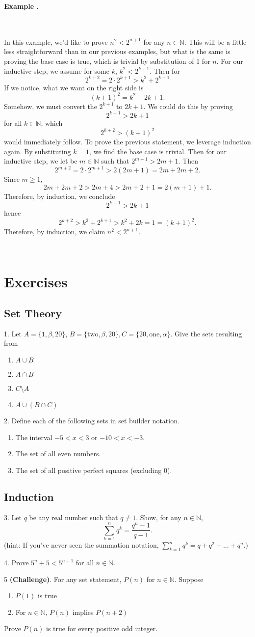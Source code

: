 \documentclass[11pt]{article}
\numberwithin{lemma}{section}
\numberwithin{equation}{section}
\numberwithin{define}{section}
\numberwithin{prop}{section}
\numberwithin{figure}{section}
\numberwithin{theorem}{section}
\newcounter{ex}[section]
\newenvironment{ex}[0]{

	\refstepcounter{ex}
	\begin{large}
    \textbf{Example \theex .}
    \end{large}\\\\
    }
    {
    \\
    }
\numberwithin{ex}{section}
\def\nat{\mathbb{N}}
\begin{document}
\begin{ex}
	In this example, we'd like to prove $n^2<2^{n+1}$ for any $n\in\nat$. This will be a little less straightforward than in our previous examples, but what is the same is proving the base case is true, which is trivial by substitution of 1 for $n$. For our inductive step, we assume for some $k$, $k^2<2^{k+1}$. Then for
	$$2^{k+2}=2\cdot 2^{k+1}>k^2+2^{k+1}$$
	If we notice, what we want on the right side is 
	$$(k+1)^2=k^2+2k+1.$$
	Somehow, we must convert the $2^{k+1}$ to $2k+1$. We could do this by proving 
	$$2^{k+1}>2k+1$$ 
	for all $k\in\nat$, which 
	$$2^{k+2}>(k+1)^2$$ 
	would immediately follow.
	To prove the previous statement, we leverage induction again. By substituting $k=1$, we find the base case is trivial. Then for our inductive step, we let be $m\in\nat$ such that $2^{m+1}>2m+1$.
	Then
	$$2^{m+2}=2\cdot2^{m+1}>2(2m+1)=2m+2m+2.$$
	Since $m\ge 1$,
	$$2m+2m+2>2m+4>2m+2+1=2(m+1)+1.$$
	Therefore, by induction, we conclude 
	$$2^{k+1}>2k+1$$
	hence
	$$2^{k+2}>k^2+2^{k+1}>k^2+2k=1=(k+1)^2.$$
	Therefore, by induction, we claim $n^2<2^{n+1}$.
\end{ex}

\section{Exercises}
\subsection{Set Theory}
1. Let $A=\{1,\beta,20\}$, $B=\{\text{two},\beta,20\},C=\{20,\text{one},\alpha\}$. Give the sets resulting from
\begin{enumerate}[label=\alph*)]
	\item $A \cup B$
	\item $A \cap B$
	\item $C \setminus A$
	\item $A \cup (B\cap C)$
\end{enumerate}
2. Define each of the following sets in set builder notation.
\begin{enumerate}[label=\alph*)]
	\item The interval $-5<x<3$ or $-10<x<-3$.
	\item The set of all even numbers.
	\item The set of all positive perfect squares (excluding 0).
\end{enumerate}
\subsection{Induction}
3. Let $q$ be any real number such that $q\neq1$. Show, for any $n\in\nat$,
$$\sum_{k=1}^nq^k=\frac{q^n-1}{q-1}.$$
(hint: If you've never seen the summation notation, $\sum_{k=1}^nq^k=q+q^2+...+q^n$.)

4. Prove $5^n+5<5^{n+1}$ for all $n\in\nat$.

5 \textbf{(Challenge)}. For any set statement, $P(n)$ for $n\in\nat$. Suppose 
\begin{enumerate}
	\item $P(1)$ is true
	\item For $n\in\nat$, $P(n)$ implies $P(n+2)$
\end{enumerate}
Prove $P(n)$ is true for every positive odd integer. 
\end{document}
